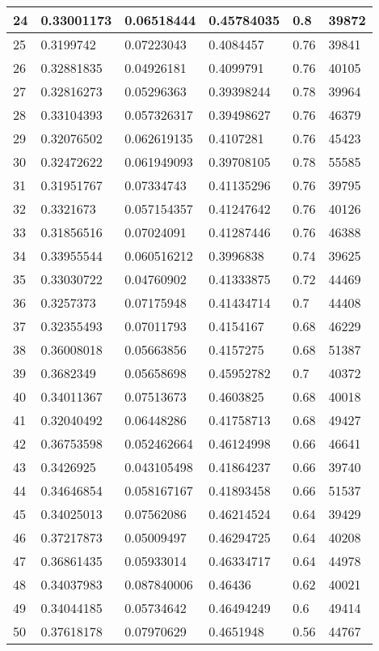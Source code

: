 \begin{longtable}{|l|l|l|l|l|l|}
24 & 0.33001173 & 0.06518444 & 0.45784035 & 0.8 & 39872 \\ \hline 
25 & 0.3199742 & 0.07223043 & 0.4084457 & 0.76 & 39841 \\ \hline 
26 & 0.32881835 & 0.04926181 & 0.4099791 & 0.76 & 40105 \\ \hline 
27 & 0.32816273 & 0.05296363 & 0.39398244 & 0.78 & 39964 \\ \hline 
28 & 0.33104393 & 0.057326317 & 0.39498627 & 0.76 & 46379 \\ \hline 
29 & 0.32076502 & 0.062619135 & 0.4107281 & 0.76 & 45423 \\ \hline 
30 & 0.32472622 & 0.061949093 & 0.39708105 & 0.78 & 55585 \\ \hline 
31 & 0.31951767 & 0.07334743 & 0.41135296 & 0.76 & 39795 \\ \hline 
32 & 0.3321673 & 0.057154357 & 0.41247642 & 0.76 & 40126 \\ \hline 
33 & 0.31856516 & 0.07024091 & 0.41287446 & 0.76 & 46388 \\ \hline 
34 & 0.33955544 & 0.060516212 & 0.3996838 & 0.74 & 39625 \\ \hline 
35 & 0.33030722 & 0.04760902 & 0.41333875 & 0.72 & 44469 \\ \hline 
36 & 0.3257373 & 0.07175948 & 0.41434714 & 0.7 & 44408 \\ \hline 
37 & 0.32355493 & 0.07011793 & 0.4154167 & 0.68 & 46229 \\ \hline 
38 & 0.36008018 & 0.05663856 & 0.4157275 & 0.68 & 51387 \\ \hline 
39 & 0.3682349 & 0.05658698 & 0.45952782 & 0.7 & 40372 \\ \hline 
40 & 0.34011367 & 0.07513673 & 0.4603825 & 0.68 & 40018 \\ \hline 
41 & 0.32040492 & 0.06448286 & 0.41758713 & 0.68 & 49427 \\ \hline 
42 & 0.36753598 & 0.052462664 & 0.46124998 & 0.66 & 46641 \\ \hline 
43 & 0.3426925 & 0.043105498 & 0.41864237 & 0.66 & 39740 \\ \hline 
44 & 0.34646854 & 0.058167167 & 0.41893458 & 0.66 & 51537 \\ \hline 
45 & 0.34025013 & 0.07562086 & 0.46214524 & 0.64 & 39429 \\ \hline 
46 & 0.37217873 & 0.05009497 & 0.46294725 & 0.64 & 40208 \\ \hline 
47 & 0.36861435 & 0.05933014 & 0.46334717 & 0.64 & 44978 \\ \hline 
48 & 0.34037983 & 0.087840006 & 0.46436 & 0.62 & 40021 \\ \hline 
49 & 0.34044185 & 0.05734642 & 0.46494249 & 0.6 & 49414 \\ \hline 
50 & 0.37618178 & 0.07970629 & 0.4651948 & 0.56 & 44767 \\ \hline 
\end{longtable}